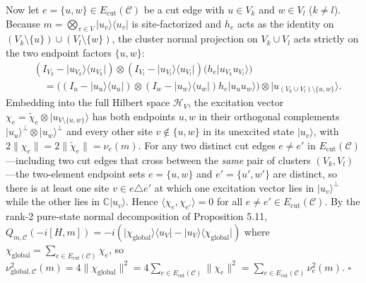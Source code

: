 \documentclass[
  11pt,
]{article}
\begin{document}
Now let \(e = \{u,w\} \in E_{\mathrm{cut}}(\mathcal{C})\) be a cut edge with \(u \in V_k\) and \(w \in V_l\) (\(k\ne l\)). Because \(m = \bigotimes_{v\in V}\lvert u_v\rangle\langle u_v\rvert\) is site-factorized and \(h_e\) acts as the identity on \((V_k\setminus\{u\})\cup(V_l\setminus\{w\})\), the cluster normal projection on \(V_k\cup V_l\) acts strictly on the two endpoint factors \(\{u,w\}\):
\[
\begin{aligned}
&(I_{V_k} - \lvert u_{V_k}\rangle\langle u_{V_k}\rvert)\otimes (I_{V_l} - \lvert u_{V_l}\rangle\langle u_{V_l}\rvert)\bigl(h_e\lvert u_{V_k}u_{V_l}\rangle\bigr)\\
&\quad = \bigl((I_u - \lvert u_u\rangle\langle u_u\rvert)\otimes(I_w - \lvert u_w\rangle\langle u_w\rvert)h_e\lvert u_u u_w\rangle\bigr)\otimes \lvert u_{(V_k\cup V_l)\setminus\{u,w\}}\rangle.
\end{aligned}
\]
Embedding into the full Hilbert space \(\mathcal{H}_V\), the excitation vector \(\chi_e = \widetilde{\chi}_e \otimes \lvert u_{V\setminus\{u,w\}}\rangle\) has both endpoints \(u,w\) in their orthogonal complements \(\lvert u_u\rangle^\perp \otimes \lvert u_w\rangle^\perp\) and every other site \(v \notin \{u,w\}\) in its unexcited state \(\lvert u_v\rangle\), with \(2\lVert\chi_e\rVert = 2\lVert\widetilde{\chi}_e\rVert = \nu_e(m)\).
For any two distinct cut edges \(e \ne e'\) in \(E_{\mathrm{cut}}(\mathcal{C})\)---including two cut edges that cross between the \emph{same} pair of clusters \((V_k, V_l)\)---the two-element endpoint sets \(e=\{u,w\}\) and \(e'=\{u',w'\}\) are distinct, so there is at least one site \(v \in e\triangle e'\) at which one excitation vector lies in \(\lvert u_v\rangle^\perp\) while the other lies in \(\mathbb{C}\lvert u_v\rangle\). Hence \(\langle \chi_e, \chi_{e'}\rangle = 0\) for all \(e \ne e' \in E_{\mathrm{cut}}(\mathcal{C})\).
By the rank-2 pure-state normal decomposition of Proposition 5.11, \(Q_{m,\mathcal{C}}(-i[H,m]) = -i(\lvert\chi_{\mathrm{global}}\rangle\langle u_V\rvert - \lvert u_V\rangle\langle\chi_{\mathrm{global}}\rvert)\) where \(\chi_{\mathrm{global}} = \sum_{e\in E_{\mathrm{cut}}(\mathcal{C})} \chi_e\), so \(\nu_{\mathrm{global},\mathcal{C}}^2(m) = 4\lVert\chi_{\mathrm{global}}\rVert^2 = 4\sum_{e\in E_{\mathrm{cut}}(\mathcal{C})}\lVert\chi_e\rVert^2 = \sum_{e\in E_{\mathrm{cut}}(\mathcal{C})}\nu_e^2(m)\). \(\square\)
\end{document}
